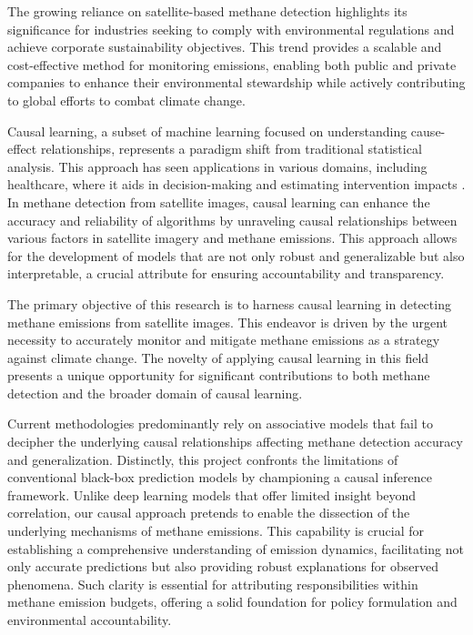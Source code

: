 The growing reliance on satellite-based methane detection highlights its significance for industries seeking to comply with environmental regulations and achieve corporate sustainability objectives. This trend provides a scalable and cost-effective method for monitoring emissions, enabling both public and private companies to enhance their environmental stewardship while actively contributing to global efforts to combat climate change.


Causal learning, a subset of machine learning focused on understanding cause-effect relationships, represents a paradigm shift from traditional statistical analysis. This approach has seen applications in various domains, including healthcare, where it aids in decision-making and estimating intervention impacts \cite{pearl_causal_2009, verboven_combining_2022, subramanian_estimating_2023, otgonbaatar_causality_2022, angell_estimating_2021, osazuwa_ness_causal_2024}. In methane detection from satellite images, causal learning can enhance the accuracy and reliability of algorithms by unraveling causal relationships between various factors in satellite imagery and methane emissions. This approach allows for the development of models that are not only robust and generalizable but also interpretable, a crucial attribute for ensuring accountability and transparency.


The primary objective of this research is to harness causal learning in detecting methane emissions from satellite images. This endeavor is driven by the urgent necessity to accurately monitor and mitigate methane emissions as a strategy against climate change. The novelty of applying causal learning in this field presents a unique opportunity for significant contributions to both methane detection and the broader domain of causal learning. 

Current methodologies predominantly rely on associative models that fail to decipher the underlying causal relationships affecting methane detection accuracy and generalization. Distinctly, this project confronts the limitations of conventional black-box prediction models by championing a causal inference framework. Unlike deep learning models that offer limited insight beyond correlation, our causal approach pretends to enable the dissection of the underlying mechanisms of methane emissions. This capability is crucial for establishing a comprehensive understanding of emission dynamics, facilitating not only accurate predictions but also providing robust explanations for observed phenomena. Such clarity is essential for attributing responsibilities within methane emission budgets, offering a solid foundation for policy formulation and environmental accountability.

